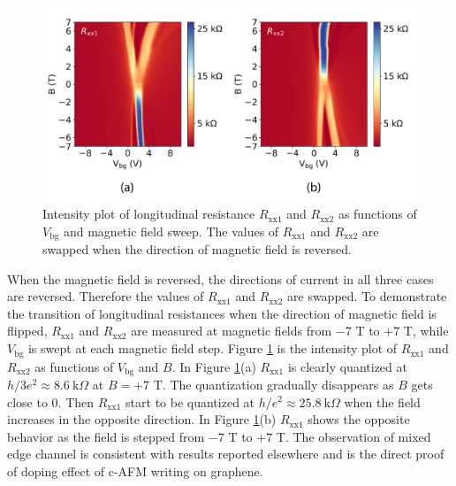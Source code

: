 \documentclass[pdflatex, sectionletters, 12pt]{pittetd}    %
\begin{document}
\begin{figure}[h!]
	\centering
	\includegraphics[width=1.0\textwidth]{Drawing/MixingIntensityPlot.pdf}
	\caption{Intensity plot of longitudinal resistance $R_\mathrm{xx1}$ and $R_\mathrm{xx2}$ as functions of $V_\mathrm{bg}$ and magnetic field sweep. The values of $R_\mathrm{xx1}$ and $R_\mathrm{xx2}$ are swapped when the direction of magnetic field is reversed.}
	\label{FIG:MixingIntensityPlot}
\end{figure}
 
When the magnetic field is reversed, the directions of current in all three cases are reversed. Therefore the values of $R_\mathrm{xx1}$ and $R_\mathrm{xx2}$ are swapped. To demonstrate the transition of longitudinal resistances when the direction of magnetic field is flipped, $R_\mathrm{xx1}$ and $R_\mathrm{xx2}$ are measured at magnetic fields from $-7$ T to $+7$ T, while $V_\mathrm{bg}$ is swept at each magnetic field step. Figure \ref{FIG:MixingIntensityPlot} is the intensity plot of $R_\mathrm{xx1}$ and $R_\mathrm{xx2}$ as functions of $V_\mathrm{bg}$ and $B$. In Figure \ref{FIG:MixingIntensityPlot}(a) $R_\mathrm{xx1}$ is clearly quantized at $h/3e^2 \approx 8.6 \ \mathrm{k}\Omega$ at $B = +7$ T. The quantization gradually disappears as $B$ gets close to 0. Then $R_\mathrm{xx1}$ start to be quantized at $h/e^2 \approx 25.8 \ \mathrm{k}\Omega$ when the field increases in the opposite direction. In Figure \ref{FIG:MixingIntensityPlot}(b) $R_\mathrm{xx1}$ shows the opposite behavior as the field is stepped from $-7$ T to $+7$ T. The observation of mixed edge channel is consistent with results reported elsewhere\cite{williams2007quantum, lohmann2009four, amet2014selective, abanin2007quantized, amet2014selective, ki2010dependence, klimov2015edge, woszczyna2011graphene, ozyilmaz2007electronic, schmidt2013mixing} and is the direct proof of doping effect of c-AFM writing on graphene.
\end{document}
